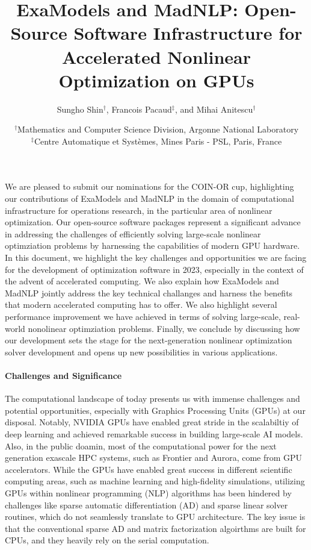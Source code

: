 \documentclass{article}
\title{ExaModels and MadNLP: Open-Source Software Infrastructure for Accelerated Nonlinear Optimization on GPUs}
\author{Sungho Shin$^\dag$, Francois Pacaud$^\ddag$, and Mihai Anitescu$^\dag$}
\date{\small
  $^\dag$Mathematics and Computer Science Division, Argonne National Laboratory\\
  $^\ddag$Centre Automatique et Systèmes, Mines Paris - PSL, Paris, France
}
\begin{document}
\maketitle 

We are pleased to submit our nominations for the COIN-OR cup, highlighting our contributions of ExaModels and MadNLP in the domain of computational infrastructure for operations research, in the particular area of nonlinear optimization. Our open-source software packages represent a significant advance in addressing the challenges of efficiently solving large-scale nonlinear optimziation problems by harnessing the capabilities of modern GPU hardware. In this document, we highlight the key challenges and opportunities we are facing for the development of optimization software in 2023, especially in the context of the advent of accelerated computing. We also explain how ExaModels and MadNLP jointly address the key technical challanges and harness the benefits that modern accelerated computing has to offer. We also highlight several performance improvement we have achieved in terms of solving large-scale, real-world nonolinear optimziation problems. Finally, we conclude by discussing how our development sets the stage for the next-generation nonlinear optimization solver development and opens up new possibilities in various applications.

\paragraph{Challenges and Significance}
The computational landscape of today presents us with immense challenges and potential opportunities, especially with Graphics Processing Units (GPUs) at our disposal. Notably, NVIDIA GPUs have enabled great stride in the scalabiltiy of deep learning and achieved remarkable success in building large-scale AI models. Also, in the public doamin, most of the computational power for the next generation exascale HPC systems, such as Frontier and Aurora, come from GPU accelerators. While the GPUs have enabled great success in different scientific computing areas, such as machine learning and high-fidelity simulations, utilizing GPUs within nonlinear programming (NLP) algorithms has been hindered by challenges like sparse automatic differentiation (AD) and sparse linear solver routines, which do not seamlessly translate to GPU architecture. The key issue is that the conventional sparse AD and matrix factorization algoirthms are built for CPUs, and they heavily rely on the serial computation. 
\end{document}
